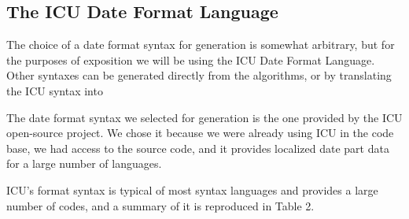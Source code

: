 \subsection{The ICU Date Format Language}
The choice of a date format syntax for generation is somewhat arbitrary, but for the purposes of exposition we will be using the ICU Date Format Language. Other syntaxes can be generated directly from the algorithms, or by translating the ICU syntax into 

The date format syntax we selected for generation is the one provided by the ICU open-source project. We chose it because we were already using ICU in the code base, we had access to the source code, and it provides localized date part data for a large number of languages. 

ICU's format syntax is typical of most syntax languages and provides a large number of codes, and a summary of it is reproduced in Table 2.

